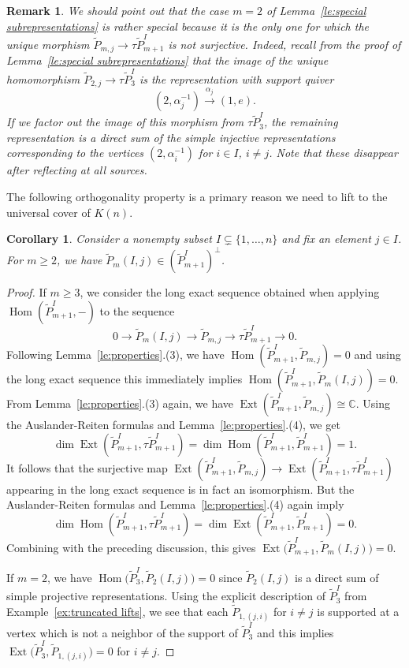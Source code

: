 \documentclass{amsart}
\newtheorem{corollary}[theorem]{Corollary}
\newtheorem{remark}[theorem]{Remark}
\numberwithin{equation}{section}
\newcommand{\CC}{\mathbb{C}}
\newcommand{\Ext}{\operatorname{Ext}}
\newcommand{\Hom}{\operatorname{Hom}}
\newcommand{\ses}[3]{0\rightarrow #1\rightarrow #2\rightarrow#3\rightarrow 0}
\begin{document}
\begin{remark}
  We should point out that the case $m=2$ of Lemma~\ref{le:special subrepresentations} is rather special because it is the only one for which the unique morphism $\tilde P_{m,j}\to\tau\tilde P_{m+1}^I$ is not surjective.
  Indeed, recall from the proof of Lemma~\ref{le:special subrepresentations} that the image of the unique homomorphism $\tilde P_{2,j}\to\tau\tilde P_3^I$ is the representation with support quiver
  \[(2,\alpha_j^{-1})\xrightarrow{\alpha_j}(1,e).\] 
  If we factor out the image of this morphism from $\tau\tilde P_3^I$, the remaining representation is a direct sum of the simple injective representations corresponding to the vertices $(2,\alpha_i^{-1})$ for $i\in I$, $i\ne j$.
  Note that these disappear after reflecting at all sources.
\end{remark}

The following orthogonality property is a primary reason we need to lift to the universal cover of $K(n)$.
\begin{corollary}
  \label{cor:perpendicular}
  Consider a nonempty subset $I\subsetneq\{1,\ldots,n\}$ and fix an element $j\in I$.
  For $m\geq 2$, we have $\tilde P_m(I,j)\in (\tilde P_{m+1}^I)^\perp$.
\end{corollary}
\begin{proof}
  If $m\geq 3$, we consider the long exact sequence obtained when applying $\Hom(\tilde P_{m+1}^I,-)$ to the sequence
  \[\ses{\tilde P_m(I,j)}{\tilde P_{m,j}}{\tau\tilde P_{m+1}^I}.\]
  Following Lemma~\ref{le:properties}.(3), we have $\Hom(\tilde P_{m+1}^I,\tilde P_{m,j})=0$ and using the long exact sequence this immediately implies $\Hom(\tilde P_{m+1}^I,\tilde P_m(I,j))=0$.
  From Lemma~\ref{le:properties}.(3) again, we have $\Ext(\tilde P_{m+1}^I,\tilde P_{m,j})\cong\CC$.
  Using the Auslander-Reiten formulas \cite[Theorem IV.2.13]{ass} and Lemma~\ref{le:properties}.(4), we get
  \[\dim\Ext(\tilde P_{m+1}^I,\tau\tilde P_{m+1}^I)=\dim\Hom(\tilde P_{m+1}^I,\tilde P_{m+1}^I)=1.\]
  It follows that the surjective map $\Ext(\tilde P_{m+1}^I,\tilde P_{m,j})\to\Ext(\tilde P_{m+1}^I,\tau\tilde P_{m+1}^I)$ appearing in the long exact sequence is in fact an isomorphism.
  But the Auslander-Reiten formulas and Lemma~\ref{le:properties}.(4) again imply 
  \[\dim\Hom(\tilde P_{m+1}^I,\tau\tilde P_{m+1}^I)=\dim\Ext(\tilde P_{m+1}^I,\tilde P_{m+1}^I)=0.\]
  Combining with the preceding discussion, this gives $\Ext\!\big(\tilde P_{m+1}^I,\tilde P_m(I,j)\big)=0$.
  
  If $m=2$, we have $\Hom\!\big(\tilde P_3^I,\tilde P_2(I,j)\big)=0$ since $\tilde P_2(I,j)$ is a direct sum of simple projective representations.
  Using the explicit description of $\tilde P_3^I$ from Example~\ref{ex:truncated lifts}, we see that each $\tilde P_{1,(j,i)}$ for $i\ne j$ is supported at a vertex which is not a neighbor of the support of $\tilde P_3^I$ and this implies $\Ext\!\big(\tilde P_3^I,\tilde P_{1,(j,i)}\big)=0$ for $i\neq j$.
\end{proof}
\end{document}
